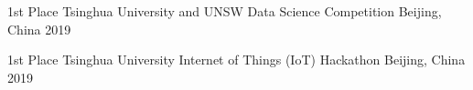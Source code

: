 



\begin{cvhonors}

  \cvhonor
    {1st Place} %
    {Tsinghua University and UNSW Data Science Competition} %
    {Beijing, China} %
    {2019} %

  \cvhonor
    {1st Place} %
    {Tsinghua University Internet of Things (IoT) Hackathon} %
    {Beijing, China} %
    {2019} %

\end{cvhonors}




 

